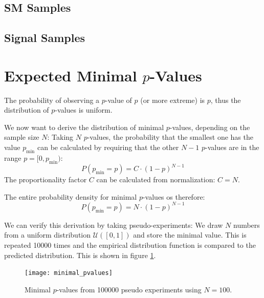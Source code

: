 \pagebreak
{
    \begin{landscape}    
        \subsection{\acl{SM} Samples}
        {
            \scriptsize
            \def\arraystretch{1}
            \centering
            
        }
        \newpage
        \subsection{Signal Samples}     
        {
            \scriptsize
            \def\arraystretch{1}
            \centering
            
        }
    \end{landscape}
}

\newpage
\section{Expected Minimal $p$-Values}
\label{app:minimal_pvalues}

The probability of observing a $p$-value of $p$ (or more extreme) is $p$, thus the distribution of $p$-values is uniform.

We now want to derive the distribution of minimal $p$-values, depending on the sample size $N$: 
Taking $N$ $p$-values, the probability that the smallest one has the value $p_\text{min}$ can be calculated by requiring that the other $N-1$ $p$-values are in the range $p=[0, p_\text{min})$:
\begin{equation}
    P(p_\text{min} = p) = C \cdot \left(1-p\right)^{N-1}
\end{equation}
The proportionality factor $C$ can be calculated from normalization: $C = N$.

The entire probability density for minimal $p$-values os therefore:
\begin{equation}
    P(p_\text{min} = p) = N \cdot \left(1-p\right)^{N-1}
\end{equation}

We can verify this derivation by taking pseudo-experiments: We draw $N$ numbers from a uniform distribution $\mathcal{U}([0, 1])$ and store the minimal value. This is repeated \num{10000} times and the empirical distribution function is compared to the predicted distribution. This is shown in figure \ref{fig:minimal_pvalues}.
\begin{figure}
    \centering
    \texttt{[image: minimal\_pvalues]}
    \caption{Minimal $p$-values from \num{100000} pseudo experiments using $N = \num{100}$.}
    \label{fig:minimal_pvalues}
\end{figure}

